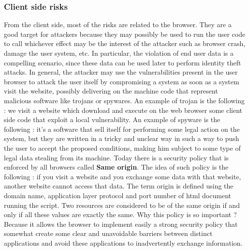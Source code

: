 \subsubsection{Client side risks}
From the client side, most of the risks are related to the browser. They are a good target for attackers because they may possibly be used to run the user code to call whichever effect may be the interest of the attacker such as browser crash, damage the user system, etc. In particular, the violation of end user data is a compelling scenario, since these data can be used later to perform identity theft attacks. In general, the attacker may use the vulnerabilities present in the user browser to attack the user itself by compromising a system as soon as a system visit the website, possibly delivering on the machine code that represent malicious software like trojans or spywares. An example of trojan is the following : we visit a website which download and execute on the web browser some client side code that exploit a local vulnerability. An example of spyware is the following : it's a software that sell itself for performing some legal action on the system, but they are written in a tricky and unclear way in such a way to push the user to accept the proposed conditions, making him subject to some type of legal data stealing from its machine. Today there is a security policy that is enforced by all browsers called \textbf{Same origin}. The idea of such policy is the following : if you visit a website and you exchange some data with that website, another website cannot access that data. The term origin is defined using the domain name, application layer protocol and port number of html document running the script. Two resources are considered to be of the same origin if and only if all these values are exactly the same. Why this policy is so important ? Because it allows the browser to implement easily a strong security policy that somewhat create some clear and unavoidable barriers between distinct applications and avoid these applications to inadvertently exchange information. 
